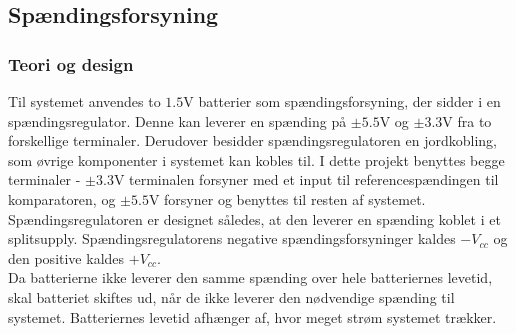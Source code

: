\subsection{Spændingsforsyning} \label{Spaendingsforsying}
\subsubsection{Teori og design}
Til systemet anvendes to $1.5$V batterier som spændingsforsyning, der sidder i en spændingsregulator. Denne kan leverer en spænding på $\pm5.5$V og $\pm3.3$V fra to forskellige terminaler. Derudover besidder spændingsregulatoren en jordkobling, som øvrige komponenter i systemet kan kobles til. I dette projekt benyttes begge terminaler - $\pm3.3$V terminalen forsyner med et input til referencespændingen til komparatoren, og $\pm5.5$V forsyner og benyttes til resten af systemet. Spændingsregulatoren er designet således, at den leverer en spænding koblet i et splitsupply. Spændingsregulatorens negative spændingsforsyninger kaldes $-V_{cc}$ og den positive kaldes $+V_{cc}$. \\%
Da batterierne ikke leverer den samme spænding over hele batteriernes levetid, skal batteriet skiftes ud, når de ikke leverer den nødvendige spænding til systemet. Batteriernes levetid afhænger af, hvor meget strøm systemet trækker. %

